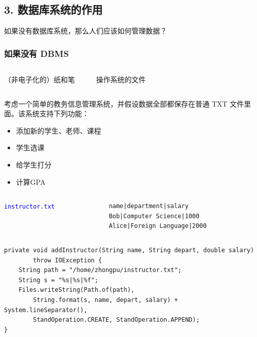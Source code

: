 \documentclass[aspectratio=169, 14pt]{beamer}
\begin{document}
\begin{frame}
	\section{\textcolor{darkmidnightblue}{3. 数据库系统的作用}}
	如果没有数据库系统，那么人们应该如何管理数据？
\end{frame}

\begin{frame}
	\frametitle{如果没有 DBMS}

	\begin{columns}
		{\Large {}}  {\huge {}}

		（非电子化的）纸和笔

		{\LARGE {}      }

		操作系统的文件
	\end{columns}
\end{frame}
\begin{frame}
	考虑一个简单的\alert{教务信息管理系统}，并假设数据全部都保存在普通 TXT 文件里面。该系统支持下列功能：
	\begin{itemize}
		\item 添加新的学生、老师、课程
		\item 学生选课
		\item 给学生打分
		\item 计算GPA
	\end{itemize}
\end{frame}

\begin{frame}[fragile]

	\begin{columns}
		\column{0.2\textwidth}
		{\large \textcolor{blue}{\texttt{instructor.txt}}}
		\column{0.7\textwidth}
		\begin{verbatim}
            name|department|salary
            Bob|Computer Science|1000
            Alice|Foreign Language|2000        
         \end{verbatim}
	\end{columns}
	\pause
	\begin{verbatim}
private void addInstructor(String name, String depart, double salary)    
        throw IOException {
    String path = "/home/zhongpu/instructor.txt";
    String s = "%s|%s|%f";
    Files.writeString(Path.of(path),
        String.format(s, name, depart, salary) + System.lineSeparator(),
        StandOperation.CREATE, StandOperation.APPEND); 
}
    \end{verbatim}

\end{frame}
\end{document}
